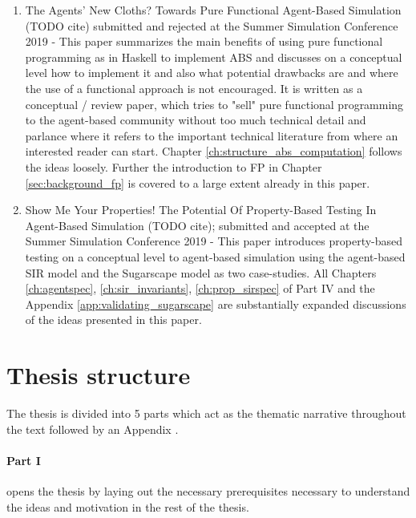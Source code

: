 \begin{enumerate}
	\item The Agents' New Cloths? Towards Pure Functional Agent-Based Simulation (TODO cite) submitted and rejected at the Summer Simulation Conference 2019 - This paper summarizes the main benefits of using pure functional programming as in Haskell to implement ABS and discusses on a conceptual level how to implement it and also what potential drawbacks are and where the use of a functional approach is not encouraged. It is written as a conceptual / review paper, which tries to "sell" pure functional programming to the agent-based community without too much technical detail and parlance where it refers to the important technical literature from where an interested reader can start. Chapter \ref{ch:structure_abs_computation} follows the ideas loosely. Further the introduction to FP in Chapter \ref{sec:background_fp} is covered to a large extent already in this paper.
	
	\item Show Me Your Properties! The Potential Of Property-Based Testing In Agent-Based Simulation (TODO cite); submitted and accepted at the Summer Simulation Conference 2019 - This paper introduces property-based testing on a conceptual level to agent-based simulation using the agent-based SIR model and the Sugarscape model as two case-studies. All Chapters 
\ref{ch:agentspec}, \ref{ch:sir_invariants}, \ref{ch:prop_sirspec} of Part IV and the Appendix \ref{app:validating_sugarscape} are substantially expanded discussions of the ideas presented in this paper.
\end{enumerate}


\section{Thesis structure}

The thesis is divided into 5 parts which act as the thematic narrative throughout the text followed by an Appendix . 

\paragraph{Part I} opens the thesis by laying out the necessary prerequisites necessary to understand the ideas and motivation in the rest of the thesis.
\medskip

